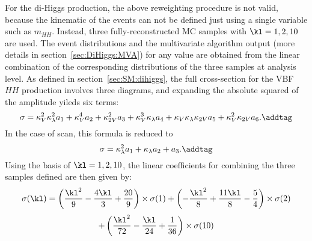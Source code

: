 For the \VBFH di-Higgs production, the above reweighting procedure is not valid, 
because the kinematic of the events can not be defined 
just using a single variable such as $m_{HH}$. 
Instead, three fully-reconstructed MC samples with $\kl = 1,2,10$ are used.
The event distributions and the multivariate algorithm output 
(more details in section~\ref{sec:DiHiggs:MVA}) 
for any \kl value are obtained from the linear combination 
of the corresponding distributions 
of the three samples at analysis level. 
As defined in section~\ref{sec:SM:dihiggs},
the full cross-section for the VBF $HH$ production involves 
three diagrams, and expanding the absolute squared of
the amplitude yileds six terms:
\[
\sigma = \kappa^2_V \kappa^2_\lambda a_1 + \kappa_V^4 a_2
+ \kappa_{2V}^2 a_3 + \kappa_V^3 \kappa_\lambda a_4
+ \kappa_V\kappa_\lambda\kappa_{2V} a_5 
+ \kappa_V^2 \kappa_{2V}a_6 .  \addtag \]
In the case of \kl scan, this formula is reduced to 
\[
\sigma = \kappa^2_\lambda a_1 + \kappa_\lambda a_2 + a_3 .
 \addtag \]
Using the basis of 
$\kl = 1,2,10$,
the linear coefficients for combining the 
three samples defined are then given by:
\begin{eqnarray*}
    \sigma (\kl) =\left(\frac{\kl^{2}}{9} - \frac{4\kl}{3} + \frac{20}{9} \right) \times \sigma (1) + \left(-\frac{\kl^{2}}{8} + \frac{11\kl}{8} - \frac{5}{4} \right) \times \sigma (2)
\end{eqnarray*}
\begin{eqnarray}
      + \left(\frac{\kl^{2}}{72} - \frac{\kl}{24} + \frac{1}{36} \right) \times \sigma (10) 
    \label{eqn:vbf-linear-comb}
\end{eqnarray}
 

